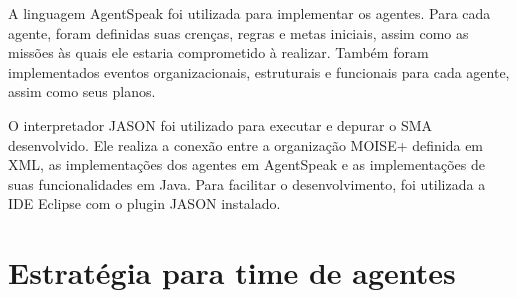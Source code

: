 \documentclass{llncs}
\begin{document}
A linguagem AgentSpeak foi utilizada para implementar os agentes. Para cada agente, foram definidas suas crenças, regras e metas iniciais, assim como as missões às quais ele estaria comprometido à realizar. Também foram implementados eventos organizacionais, estruturais e funcionais para cada agente, assim como seus planos.

O interpretador JASON foi utilizado para executar e depurar o SMA desenvolvido. Ele realiza a conexão entre a organização MOISE+ definida em XML, as implementações dos agentes em AgentSpeak e as implementações de suas funcionalidades em Java. Para facilitar o desenvolvimento, foi utilizada a IDE Eclipse com o plugin JASON instalado.


\section{Estratégia para time de agentes}


\end{document}
